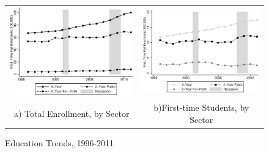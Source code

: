 \begin{figure}[h]\centering\caption{Education Trends, 1996-2011}\begin{tabular}{cc}
\includegraphics[scale=0.6]{./figures/tef_byyear.eps}&
\includegraphics[scale=0.6]{./figures/ffe_byyear.eps}\\
a) Total Enrollment, by Sector&b)First-time Students, by Sector\\


\end{tabular}
\end{figure}
